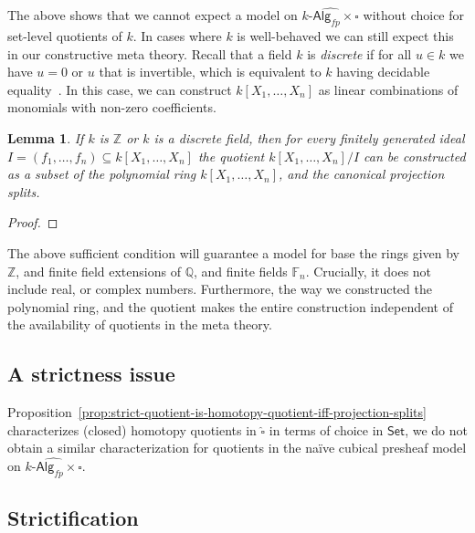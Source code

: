 \documentclass[10pt,a4paper]{article}
\newtheorem{lemma}{Lemma}[section]
\newcommand{\ints}{\mathbb{Z}}
\newcommand{\rats}{\mathbb{Q}}
\newcommand{\Set}{\mathsf{Set}}
\newcommand{\Alg}{\mathsf{Alg}}
\begin{document}
The above shows that we cannot expect a model on $\widehat{k\text{-}\Alg_{fp} \times \square}$ without choice for set-level quotients of $k$.
In cases where $k$ is well-behaved we can still expect this in our constructive meta theory.
Recall that a field $k$ is \emph{discrete} if for all $u \in k$ we have $u = 0$ or $u$ that is invertible, which is equivalent to $k$ having decidable equality~\cite{mines}.
In this case, we can construct $k[X_1, \ldots, X_n]$ as linear combinations of monomials with non-zero coefficients.

\begin{lemma}
  If $k$ is $\ints$ or $k$ is a discrete field, then for every finitely generated ideal $I = (f_1, \ldots, f_n) \subseteq k[X_1, \ldots, X_n]$ the quotient $k[X_1,\ldots,X_n]/I$ can be constructed as a subset of the polynomial ring $k[X_1, \ldots, X_n]$, and the canonical projection splits.
\end{lemma}
\begin{proof}
\end{proof}

The above sufficient condition will guarantee a model for base the rings given by $\ints$, and finite field extensions of $\rats$, and finite fields $\mathbb F_n$.
Crucially, it does not include real, or complex numbers.
Furthermore, the way we constructed the polynomial ring, and the quotient makes the entire construction independent of the availability of quotients in the meta theory.


\subsection{A strictness issue}

Proposition~\ref{prop:strict-quotient-is-homotopy-quotient-iff-projection-splits}  characterizes (closed) homotopy quotients in $\widehat\square$ in terms of choice in $\Set$, we do not obtain a similar characterization for quotients in the na\"ive cubical presheaf model on $\widehat{k\text{-}\Alg_{fp} \times \square}$.

\subsection{Strictification}
\end{document}
